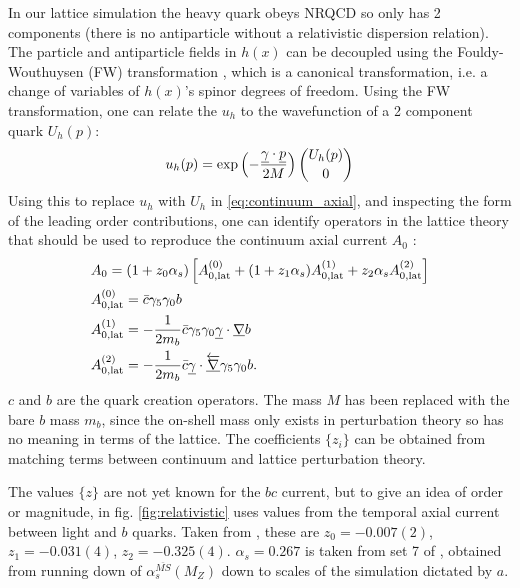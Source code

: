 In our lattice simulation the heavy quark obeys NRQCD so only has 2 components (there is no antiparticle without a relativistic dispersion relation). The particle and antiparticle fields in $h(x)$ can be decoupled using the Fouldy-Wouthuysen (FW) transformation \cite{Foldy:1949wa}, which is a canonical transformation, i.e. a change of variables of $h(x)$'s spinor degrees of freedom. Using the FW transformation, one can relate the $u_h$ to the wavefunction of a 2 component quark $U_h(p)$:
\begin{align}
	u_h(p) = \exp\left(-{\underline{\gamma}\cdot\underline{p}\over 2M}\right) \binom{U_h(p)}{0}
\end{align}
Using this to replace $u_h$ with $U_h$ in \eqref{eq:continuum_axial}, and inspecting the form of the leading order contributions, one can identify operators in the lattice theory that should be used to reproduce the continuum axial current $A_0$ \cite{Dowdall:2013tga}:
\begin{align}
	&A_0 = (1+z_0 \alpha_s ) \left[ A_{0,\text{lat}}^{(0)} + (1 + z_1\alpha_s) A_{0,\text{lat}}^{(1)} + z_2\alpha_s A_{0,\text{lat}}^{(2)} \right]
	\label{eq:current_corrections}
\\	&A_{0,\text{lat}}^{(0)} = \bar{c} \gamma_5 \gamma_0 b
	\nonumber
\\	&A_{0,\text{lat}}^{(1)} = -{1\over2m_b} \bar{c} \gamma_5 \gamma_0 \underline{\gamma}\cdot\underline{\nabla} b
	\nonumber
\\	&A_{0,\text{lat}}^{(2)} = -{1\over2m_b} \bar{c} \underline{\gamma}\cdot\underline{\overleftarrow{\nabla}} \gamma_5 \gamma_0  b.
	\nonumber
\end{align}
$c$ and $b$ are the quark creation operators. The mass $M$ has been replaced with the bare $b$ mass $m_b$, since the on-shell mass only exists in perturbation theory so has no meaning in terms of the lattice. 
The coefficients $\{z_i\}$ can be obtained from matching terms between continuum and lattice perturbation theory.

The values $\{z\}$ are not yet known for the $bc$ current, but to give an idea of order or magnitude, in fig. \ref{fig:relativistic} uses values from the temporal axial current between light and $b$ quarks. Taken from \cite{Dowdall:2013tga}, these are $z_0=-0.007(2)$, $z_1=-0.031(4)$, $z_2=-0.325(4)$. $\alpha_s = 0.267$ is taken from set 7 of \cite{Colquhoun:2015oha}, obtained from running down of $\alpha_s^{\overline{MS}}(M_Z)$ down to scales of the simulation dictated by $a$.

